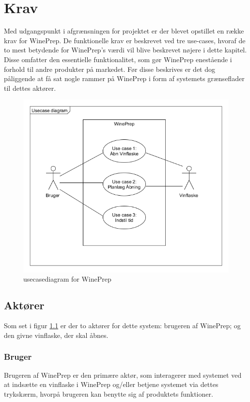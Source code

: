 \chapter{Krav}
Med udgangspunkt i afgrænsningen for projektet er der blevet opstillet en række krav for WinePrep. De funktionelle krav er beskrevet ved tre use-cases, 
hvoraf de to mest betydende for WinePrep's værdi vil blive beskrevet nøjere i dette kapitel. Disse omfatter den essentielle funktionalitet, som gør WinePrep 
enestående i forhold til andre produkter på markedet. Før disse beskrives er det dog påliggende at få sat nogle rammer på WinePrep i form af systemets 
grænseflader til dettes aktører.

\begin{figure}[H]
	\centerline{\includegraphics[scale=0.5]{Usecasediagram}}
	\caption{usecasediagram for WinePrep}
	\label{fig:UCD_WP}
\end{figure}

\section{Aktører}
Som set i figur \ref{fig:UCD_WP} er der to aktører for dette system: brugeren af WinePrep; og den givne vinflaske, der skal åbnes.

\subsection{Bruger}
Brugeren af WinePrep er den primære aktør, som interagerer med systemet ved at indsætte en vinflaske i WinePrep og/eller betjene systemet via dettes trykskærm, 
hvorpå brugeren kan benytte sig af produktets funktioner.

